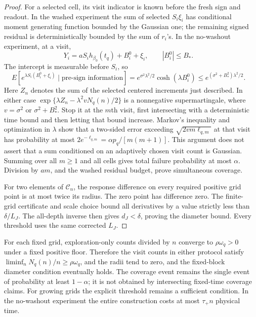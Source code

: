 \begin{proof}
For a selected cell, its visit indicator is known before the fresh sign
and readout. In the washed experiment the sum of selected \(S_i\xi_i\)
has conditional moment generating function bounded by the Gaussian one;
the remaining signed residual is deterministically bounded by the sum of
\(r_i\)'s. In the no-washout experiment, at a visit,
\[
 Y_i=aS_ih_{\beta_0}(t_q)+B_i^0+\xi_i,\qquad |B_i^0|\le B_*.
\]
The intercept is measurable before \(S_i\), so
\[
 E[e^{\lambda S_i(B_i^0+\xi_i)}\mid\text{pre-sign information}]
 =e^{\sigma^2\lambda^2/2}\cosh(\lambda B_i^0)
 \le e^{(\sigma^2+B_*^2)\lambda^2/2}.
\]
Here \(Z_n\) denotes the sum of the selected centered increments just
described. In either case \(\exp\{\lambda Z_n-\lambda^2vN_q(n)/2\}\) is a
nonnegative supermartingale, where \(v=\sigma^2\) or \(\sigma^2+B_*^2\).
Stop it at the \(m\)th visit, first intersecting with a deterministic time
bound and then letting that bound increase. Markov's inequality and
optimization in \(\lambda\) show that a two-sided error exceeding
\(\sqrt{2vm\ell_{q,m}}\) at that visit has probability at most
\(2e^{-\ell_{q,m}}=\alpha p_q/[m(m+1)]\). This argument does not assert
that a sum conditioned on an adaptively chosen visit count is Gaussian.
Summing over all \(m\ge1\) and all cells gives total failure probability
at most \(\alpha\). Division by \(am\), and the washed residual budget,
prove simultaneous coverage.

For two elements of \(\mathcal C_n\), the response difference on every
required positive grid point is at most twice its radius. The zero point
has difference zero. The finite-grid certificate and scale choice bound
all derivatives by a value strictly less than \(\delta/L_J\).
The all-depth inverse then gives \(d_J<\delta\), proving the diameter
bound. Every threshold uses the same corrected \(L_J\).
\end{proof}

For each fixed grid, exploration-only counts divided by \(n\) converge
to \(\rho\omega_q>0\) under a fixed positive floor. Therefore the visit
counts in either protocol satisfy \(\liminf_n N_q(n)/n\ge\rho\omega_q\),
and the
radii tend to zero, and the fixed-block diameter condition eventually
holds. The coverage event remains the single event of probability at least
\(1-\alpha\); it is not obtained by intersecting fixed-time coverage claims.
For growing grids the explicit threshold remains a sufficient condition.
In the no-washout experiment the entire construction costs at most
\(\tau_+n\) physical time.
